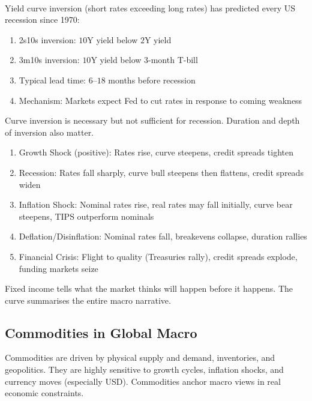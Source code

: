 \begin{remark} \\
Yield curve inversion (short rates exceeding long rates) has predicted every US recession since 1970:
\begin{enumerate}[label=\roman*.]
\setlength{\itemsep}{0pt}
\item 2s10s inversion: $10$Y yield below $2$Y yield
\item 3m10s inversion: $10$Y yield below $3$-month T-bill
\item Typical lead time: $6$--$18$ months before recession
\item Mechanism: Markets expect Fed to cut rates in response to coming weakness
\end{enumerate}
Curve inversion is necessary but not sufficient for recession. Duration and depth of inversion also matter.
\end{remark}

\begin{remark} 
\begin{enumerate}[label=\roman*.]
\setlength{\itemsep}{0pt}
\item Growth Shock (positive): Rates rise, curve steepens, credit spreads tighten
\item Recession: Rates fall sharply, curve bull steepens then flattens, credit spreads widen
\item Inflation Shock: Nominal rates rise, real rates may fall initially, curve bear steepens, TIPS outperform nominals
\item Deflation/Disinflation: Nominal rates fall, breakevens collapse, duration rallies
\item Financial Crisis: Flight to quality (Treasuries rally), credit spreads explode, funding markets seize
\end{enumerate}
Fixed income tells what the market thinks will happen before it happens. The curve summarises the entire macro narrative.
\end{remark}

\subsection{Commodities in Global Macro}

Commodities are driven by physical supply and demand, inventories, and geopolitics. They are highly sensitive to growth cycles, inflation shocks, and currency moves (especially USD). Commodities anchor macro views in real economic constraints.

